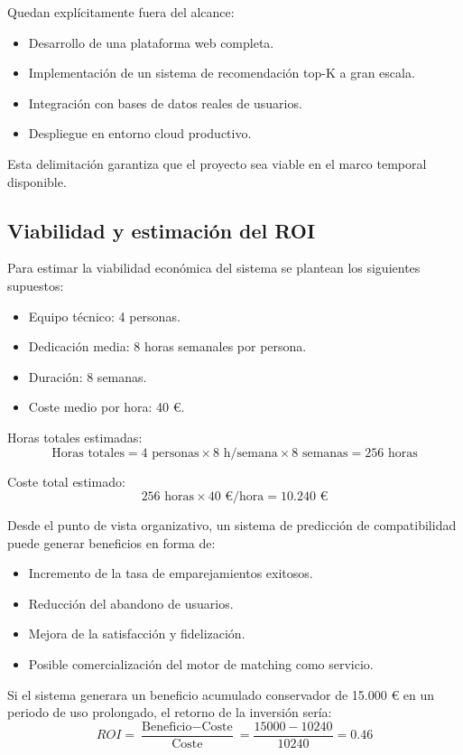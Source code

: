 Quedan explícitamente fuera del alcance:
\begin{itemize}
    \item Desarrollo de una plataforma web completa.
    \item Implementación de un sistema de recomendación top-K a gran escala.
    \item Integración con bases de datos reales de usuarios.
    \item Despliegue en entorno cloud productivo.
\end{itemize}
	
Esta delimitación garantiza que el proyecto sea viable en el marco temporal disponible.

\subsection{Viabilidad y estimación del ROI}
Para estimar la viabilidad económica del sistema se plantean los siguientes supuestos:

\begin{itemize}
    \item Equipo técnico: 4 personas.
    \item Dedicación media: 8 horas semanales por persona.
    \item Duración: 8 semanas.
    \item Coste medio por hora: 40 €.
\end{itemize}

Horas totales estimadas:
$$\text{Horas totales} = 4 \text{ personas} \times 8 \text{ h/semana} \times 8 \text{ semanas} = 256 \text{ horas}$$

Coste total estimado:
$$256 \text{ horas} \times 40 \text{ €/hora} = 10.240 \text{ €} $$

Desde el punto de vista organizativo, un sistema de predicción de compatibilidad puede generar beneficios en forma de:

\begin{itemize}
    \item Incremento de la tasa de emparejamientos exitosos.
    \item Reducción del abandono de usuarios.
    \item Mejora de la satisfacción y fidelización.
    \item Posible comercialización del motor de matching como servicio.
\end{itemize}

Si el sistema generara un beneficio acumulado conservador de 15.000 € en un periodo de uso prolongado, el retorno de la inversión sería:
$$ROI = \frac{\text{Beneficio} - \text{Coste}}{\text{Coste}} = \frac{15000 - 10240}{10240} = 0.46$$

